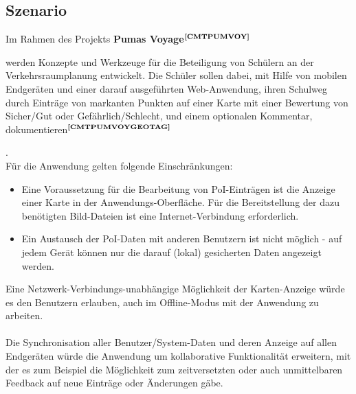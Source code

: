 \subsection{Szenario}\label{2_SZEN}
Im Rahmen des Projekts \textbf{Pumas Voyage}$^{\textbf{\ref{CMTPUMVOY}}}$%
\addtocounter{footnote}{1}%
 werden Konzepte und Werkzeuge für die Beteiligung von Schülern an der Verkehrsraumplanung entwickelt. Die Schüler sollen dabei, mit Hilfe von mobilen Endgeräten und einer darauf ausgeführten Web-Anwendung, ihren Schulweg durch Einträge von markanten Punkten  auf einer Karte mit einer Bewertung von Sicher/Gut oder Gefährlich/Schlecht, und einem optionalen Kommentar, dokumentieren$^{\textbf{\ref{CMTPUMVOYGEOTAG}}}$
\addtocounter{footnote}{1}%
.\\
Für die Anwendung gelten folgende Einschränkungen:
\begin{itemize}[leftmargin=*,noitemsep,topsep=1ex,parsep=0pt,partopsep=0pt]
\item Eine Voraussetzung für die Bearbeitung von PoI-Einträgen ist die Anzeige einer Karte in der Anwendungs-Oberfläche. Für die Bereitstellung der dazu benötigten Bild-Dateien ist eine Internet-Verbindung erforderlich.
\item Ein Austausch der PoI-Daten mit anderen Benutzern ist nicht möglich - auf jedem Gerät können nur die darauf (lokal) gesicherten Daten angezeigt werden.
\end{itemize}
\vspace{1ex}
Eine Netzwerk-Verbindungs-unabhängige Möglichkeit der Karten-Anzeige würde es den Benutzern erlauben, auch im Offline-Modus mit der Anwendung zu arbeiten.\\ \\
Die Synchronisation aller Benutzer/System-Daten und deren Anzeige auf allen Endgeräten würde die Anwendung um kollaborative Funktionalität erweitern, mit der es zum Beispiel die Möglichkeit zum zeitversetzten oder auch unmittelbaren Feedback auf neue Einträge oder Änderungen gäbe.
\noindent
